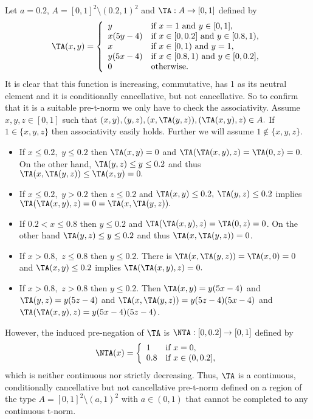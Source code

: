 \begin{example}\label{example:noncompletablepretnorm:1}
Let $a =0.2$, $A=[0,1]^2 \setminus (0.2,1)^2$  and $\TA : A \to [0,1]$ defined by 
	$$
	\TA(x,y)
	=
	\left\{ \begin{array}{ll}
		y &   \text{if }   x=1 \text{ and } y \in [0,1], \\
		x(5y-4) &   \text{if }   x \in [0,0.2] \text{ and } y \in [0.8,1), \\
		x &   \text{if }    x \in [0,1) \text{ and }  y=1, \\
		y(5x-4) &   \text{if }    x \in [0.8,1) \text{ and }  y\in [0,0.2], \\
		0 & \text{otherwise}.
	\end{array} \right. 
	$$
	It is clear that this function is increasing, commutative, has 1 as its neutral element and it is conditionally cancellative, but not cancellative. So to confirm that it is a suitable pre-t-norm we only have to check the associativity. Assume $x,y,z \in [0,1]$ such that $(x,y),(y,z),(x,\TA(y,z)),(\TA(x,y),z)\in A.$
	If $1\in \{x,y,z\}$ then associativity easily holds. Further we will assume  $1\notin \{x,y,z\}.$
	\begin{itemize}
		\item If $x\leq 0.2,$ $y\leq 0.2$ then $\TA(x,y)=0$ and $\TA(\TA(x,y),z) = \TA(0,z) = 0.$ On the other hand,
		$\TA(y,z)\leq y \leq 0.2$ and thus $\TA(x,\TA(y,z))\leq \TA(x,y)=0.$
		\item If $x\leq 0.2,$ $y>0.2$ then $z\leq 0.2$ and $\TA(x,y)\leq 0.2,$ $\TA(y,z)\leq 0.2$ implies
		$\TA(\TA(x,y),z)= 0 = \TA(x,\TA(y,z)).$
		\item If $0.2 < x \leq 0.8$ then $y \leq 0.2$ and $\TA(\TA(x,y),z)=\TA(0,z)=0$. On the other hand $\TA(y,z) \leq y \leq 0.2$ and thus $\TA(x,\TA(y,z))=0$.
		\item If $x>0.8,$ $z\leq 0.8$ then $y\leq 0.2$. There is $\TA(x,\TA(y,z))= \TA(x,0)=0$
		and $\TA(x,y)\leq 0.2$ implies $\TA(\TA(x,y),z)=0.$
		\item If $x>0.8,$ $z> 0.8$ then $y\leq 0.2.$
		Then $\TA(x,y) = y(5x-4)$ and  $\TA(y,z) = y(5z -4)$
		and $\TA(x,\TA(y,z)) = y(5z-4)(5x-4)$
		and $\TA(\TA(x,y),z) = y(5x-4)(5z-4)$.
	\end{itemize} 
	However, the induced pre-negation of $\TA$ is $\NTA : [0,0.2] \to [0,1]$ defined by
	$$\NTA(x)
	=
	\left\{ \begin{array}{ll}
		1 &   \text{if }  x=0,\\
		0.8 & \text{if } x \in (0,0.2],
	\end{array}\right.
	$$
	which is neither continuous nor strictly decreasing. Thus, $\TA$ is a continuous, conditionally cancellative but not cancellative pre-t-norm defined on a region of the type $A=[0,1]^2 \setminus (a,1)^2$ with $a \in (0,1)$ that cannot be completed to any continuous t-norm.
\end{example}

